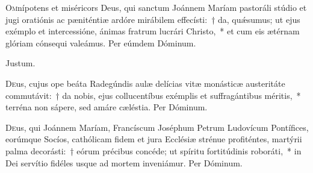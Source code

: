\documentclass[vesperale_romanum.tex]{subfiles}
\begin{document}
\duplex



\oratio

\lettrine{O}{m}nípotens et miséricors Deus, qui san\-ctum Joánnem Maríam pastoráli stúdio et jugi oratiónis ac pæniténtiæ ardóre mirábilem effecísti:~† da, quǽsumus; ut ejus exémplo et intercessióne, ánimas fratrum lucrári Christo,~* et cum eis ætérnam glóriam cónsequi valeámus. Per eúmdem Dóminum.


\vespsequentiscomm



\vv Justum.

\myrule



\duplex

\oratio

\lettrine{D}{e}us, cujus ope beáta Radegúndis aulæ delícias vitæ monásticæ austeritáte commutávit:~† da nobis, ejus collucentíbus exémplis et suffragántibus méritis,~* terréna non sápere, sed amáre cæléstia. Per Dóminum.



\myrule



\duplexmajus


\myrule
\newpage
{}



\oratio

\lettrine{D}{e}us, qui Joánnem Maríam, Francíscum Joséphum Petrum Ludovícum Pontífices, eorúmque Socíos, cathólicam fidem et jura Ecclésiæ strénue profiténtes, martýrii palma decorásti:~† eórum
précibus concéde; ut spíritu fortitúdinis roboráti,~* in Dei servítio fidéles usque ad mortem inveniámur.
Per Dóminum.
\end{document}
